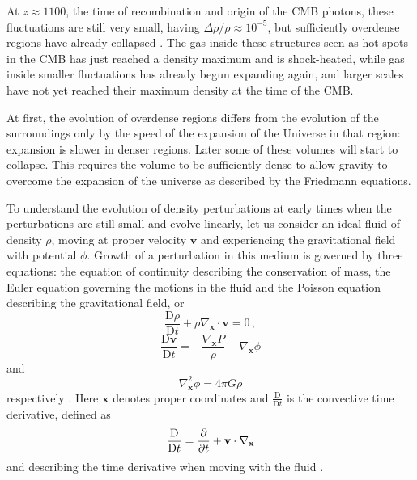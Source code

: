 \documentclass[english, twoside]{HYgradu}
\begin{document}
At $z \approx 1100$, the time of recombination and origin of the CMB photons, these fluctuations are still very small, having $\Delta\rho/\rho \approx 10^{-5}$, but sufficiently overdense regions have already collapsed \citep{mo2010galaxy}. The gas inside these structures seen as hot spots in the CMB has just reached a density maximum and is shock-heated, while gas inside smaller fluctuations has already begun expanding again, and larger scales have not yet reached their maximum density at the time of the CMB.

At first, the evolution of overdense regions differs from the evolution of the surroundings only by the speed of the expansion of the Universe in that region: expansion is slower in denser regions. Later some of these volumes will start to collapse. This requires the volume to be sufficiently dense to allow gravity to overcome the expansion of the universe as described by the Friedmann equations.

To understand the evolution of density perturbations at early times when the perturbations are still small and evolve linearly, let us consider an ideal fluid of density $\rho$, moving at proper velocity $\mathbf{v}$ and experiencing the gravitational field with potential $\phi$. Growth of a perturbation in this medium is governed by three equations: the equation of continuity describing the conservation of mass, the Euler equation governing the motions in the fluid and the Poisson equation describing the gravitational field, or
\begin{equation}\label{continuity}
\frac{\textrm{D}\rho}{\textrm{D}t} + \rho \nabla_\mathbf{x}\cdot{\mathbf{v}} = 0 \,,
\end{equation}
\begin{equation}\label{euler}
\frac{\textrm{D}\mathbf{v}}{\textrm{D}t} = - \frac{\nabla_\mathbf{x} P}{\rho} - \nabla_\mathbf{x}\phi
\end{equation}
and
\begin{equation}\label{poisson}
\nabla_\mathbf{x}^2\phi = 4\pi G\rho
\end{equation}
respectively \citep{mo2010galaxy}. Here $\mathbf{x}$ denotes proper coordinates and $\frac{\textrm{D}}{\textrm{D}t}$ is the convective time derivative, defined as
\begin{equation}
\frac{\textrm{D}}{\textrm{D}t} = \pdv{}{t} + \mathbf{v}\cdot\nabla_\mathbf{x}
\end{equation}
and describing the time derivative when moving with the fluid \citep{mo2010galaxy}.
\end{document}
